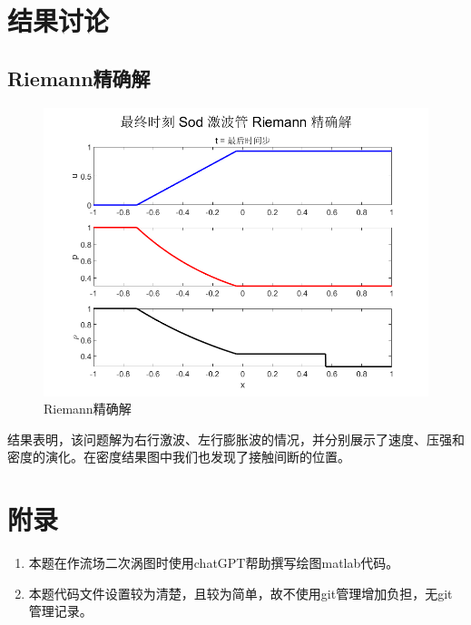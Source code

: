 \documentclass[12pt,a4paper]{article}%
\begin{document}
	\section{结果讨论}
		\subsection{Riemann精确解}
		\begin{figure}[H]
			\centering
			\begin{minipage}{0.83\textwidth}
				\centering
				\includegraphics[width=\textwidth]{./fig/Riemann.png}
				\caption{\fontsize{10pt}{15pt}\selectfont Riemann精确解}
			\end{minipage}
		\end{figure}
		结果表明，该问题解为右行激波、左行膨胀波的情况，并分别展示了速度、压强和密度的演化。在密度结果图中我们也发现了接触间断的位置。
	
	\section{附录}
	\begin{enumerate}
		\item 本题在作流场二次涡图时使用chatGPT帮助撰写绘图matlab代码。
		\item 本题代码文件设置较为清楚，且较为简单，故不使用git管理增加负担，无git管理记录。
	\end{enumerate}
	
\end{document}
